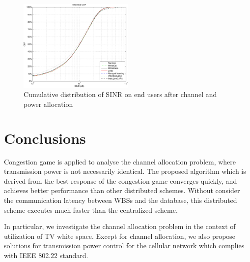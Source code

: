\documentclass[times]{ettauth}
\theoremstyle{mytheoremstyle}
\theoremstyle{mytheoremstyle}
\theoremstyle{mytheoremstyle}
\begin{document}



\begin{figure}[h!]
  \centering
      \includegraphics[width=0.5\textwidth]{24.pdf}
  		\caption{Cumulative distribution of SINR on end users after channel and power allocation}
     \label{joint_SINRcdf}
\end{figure}

\section{Conclusions}
Congestion game is applied to analyse the channel allocation problem, where transmission power is not necessarily identical.
The proposed algorithm which is derived from the best response of the congestion game converges quickly, and achieves better performance than other distributed schemes.
Without consider the communication latency between WBSs and the database, this distributed scheme executes much faster than the centralized scheme.

In particular, we investigate the channel allocation problem in the context of utilization of TV white space.
Except for channel allocation, we also propose solutions for transmission power control for the cellular network which complies with IEEE 802.22 standard.
\end{document}
